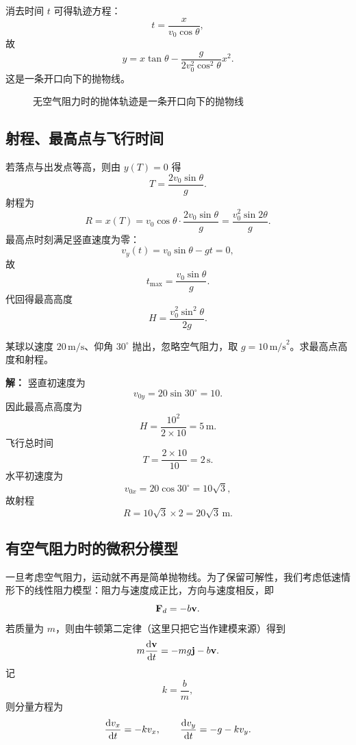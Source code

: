 消去时间 $t$ 可得轨迹方程：
\[
 t=\frac{x}{v_0\cos\theta},
\]
故
\[
 y=x\tan\theta-\frac{g}{2v_0^2\cos^2\theta}x^2.
\]
这是一条开口向下的抛物线。

\begin{figure}[htbp]
\centering
{}
\caption{无空气阻力时的抛体轨迹是一条开口向下的抛物线}
\end{figure}

\subsection{射程、最高点与飞行时间}

若落点与出发点等高，则由 $y(T)=0$ 得
\[
 T=\frac{2v_0\sin\theta}{g}.
\]
射程为
\[
 R=x(T)=v_0\cos\theta\cdot \frac{2v_0\sin\theta}{g}
=\frac{v_0^2\sin 2\theta}{g}.
\]
最高点时刻满足竖直速度为零：
\[
 v_y(t)=v_0\sin\theta-gt=0,
\]
故
\[
 t_{\max}=\frac{v_0\sin\theta}{g}.
\]
代回得最高高度
\[
 H=\frac{v_0^2\sin^2\theta}{2g}.
\]

\begin{example}[斜抛的最高点]
某球以速度 $20\,\text{m/s}$、仰角 $30^\circ$ 抛出，忽略空气阻力，取 $g=10\,\text{m/s}^2$。求最高点高度和射程。

\textbf{解：}
竖直初速度为
\[
 v_{0y}=20\sin 30^\circ=10.
\]
因此最高点高度为
\[
 H=\frac{10^2}{2\times 10}=5\,\text{m}.
\]
飞行总时间
\[
 T=\frac{2\times 10}{10}=2\,\text{s}.
\]
水平初速度为
\[
 v_{0x}=20\cos 30^\circ=10\sqrt{3},
\]
故射程
\[
 R=10\sqrt{3}\times 2=20\sqrt{3}\,\text{m}.
\]
\end{example}

\subsection{有空气阻力时的微积分模型}

一旦考虑空气阻力，运动就不再是简单抛物线。为了保留可解性，我们考虑低速情形下的线性阻力模型：阻力与速度成正比，方向与速度相反，即
\[
\vb{F}_d=-b\vb{v}.
\]
若质量为 $m$，则由牛顿第二定律（这里只把它当作建模来源）得到
\[
 m\dv{\vb{v}}{t}=-mg\vb{j}-b\vb{v}.
\]
记
\[
 k=\frac{b}{m},
\]
则分量方程为
\[
\dv{v_x}{t}=-kv_x,
\qquad
\dv{v_y}{t}=-g-kv_y.
\]

